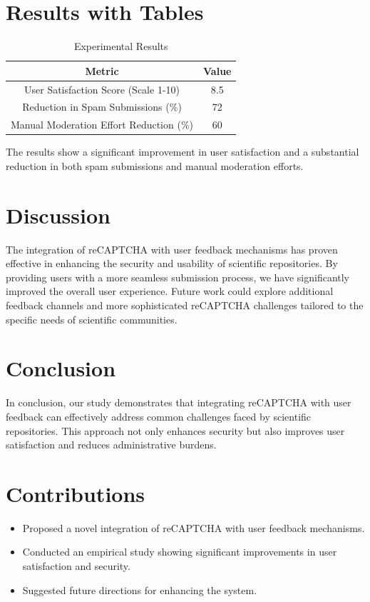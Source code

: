 \documentclass{article}
\begin{document}
\section{Results with Tables}
\begin{table}[ht]
\centering
\begin{tabular}{|c|c|}
\hline
\textbf{Metric} & \textbf{Value} \\
\hline
User Satisfaction Score (Scale 1-10) & 8.5 \\
\hline
Reduction in Spam Submissions (\%) & 72 \\
\hline
Manual Moderation Effort Reduction (\%) & 60 \\
\hline
\end{tabular}
\caption{Experimental Results}
\label{tab:results}
\end{table}

The results show a significant improvement in user satisfaction and a substantial reduction in both spam submissions and manual moderation efforts.

\section{Discussion}
The integration of reCAPTCHA with user feedback mechanisms has proven effective in enhancing the security and usability of scientific repositories. By providing users with a more seamless submission process, we have significantly improved the overall user experience. Future work could explore additional feedback channels and more sophisticated reCAPTCHA challenges tailored to the specific needs of scientific communities.

\section{Conclusion}
In conclusion, our study demonstrates that integrating reCAPTCHA with user feedback can effectively address common challenges faced by scientific repositories. This approach not only enhances security but also improves user satisfaction and reduces administrative burdens.

\section{Contributions}
\begin{itemize}
    \item Proposed a novel integration of reCAPTCHA with user feedback mechanisms.
    \item Conducted an empirical study showing significant improvements in user satisfaction and security.
    \item Suggested future directions for enhancing the system.
\end{itemize}



\end{document}
